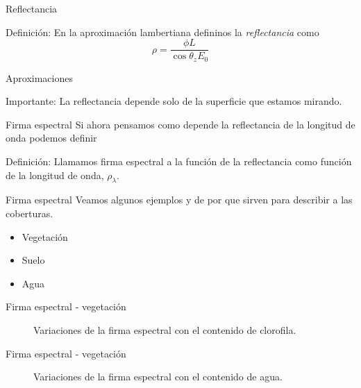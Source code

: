 \documentclass[handout,draft]{beamer}
\begin{document}
\begin{frame}{Reflectancia}
  \begin{block}{Definición:}
    En la aproximación lambertiana defininos la \emph{reflectancia} como
    \begin{equation}
      \rho = \frac{\phi L}{\cos \theta_z E_0}
    \end{equation}
  \end{block}
\end{frame}

\begin{frame}{Aproximaciones}
  \begin{alertblock}{Importante:}
    La reflectancia depende solo de la superficie que estamos mirando.
  \end{alertblock}
\end{frame}

\begin{frame}{Firma espectral}
  Si ahora pensamos como depende la reflectancia de la longitud de onda podemos definir
  \begin{block}{Definición:}
    Llamamos firma espectral a la función de la reflectancia como función de la longitud de onda, $\rho_\lambda$.
  \end{block}
\end{frame}

\begin{frame}{Firma espectral}
  Veamos algunos ejemplos y de por que sirven para describir a las coberturas.
  \begin{itemize}
    \item Vegetación
    \item Suelo
    \item Agua
  \end{itemize}
\end{frame}

\begin{frame}{Firma espectral - vegetación}
  \begin{figure}
  \centering
  \caption{Variaciones de la firma espectral con el contenido de clorofila.}
  \end{figure}
\end{frame}

\begin{frame}{Firma espectral - vegetación}
  \begin{figure}
  \centering
  \caption{Variaciones de la firma espectral con el contenido de agua.}
  \end{figure}
\end{frame}
\end{document}

